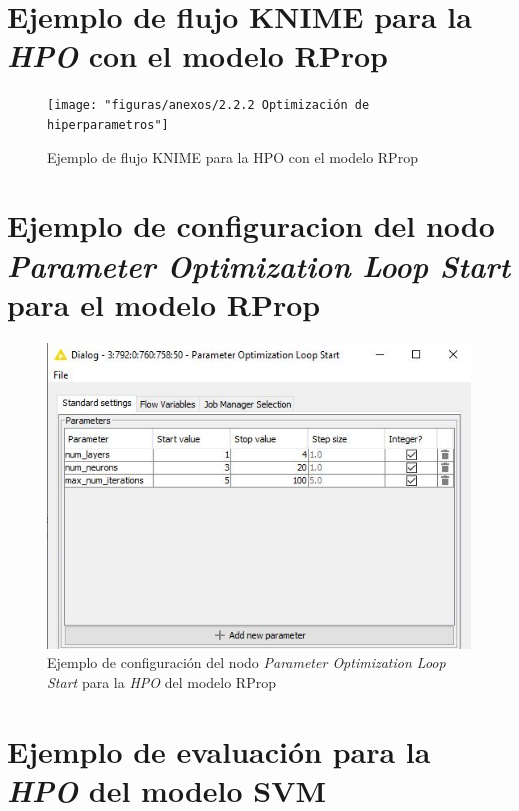 \chapter{Ejemplo de flujo KNIME para la \textit{HPO} con el modelo RProp} \label{aped:5}

\begin{figure}[H]
	\centering
	\texttt{[image: "figuras/anexos/2.2.2 Optimización de hiperparametros"]}
	\caption{Ejemplo de flujo KNIME para la HPO con el modelo RProp}
	\label{anex:hpo-rprop}
\end{figure}

\chapter{Ejemplo de configuracion del nodo \textit{Parameter Optimization Loop Start} para el modelo RProp } \label{aped:6}

\begin{figure}[H]
	\centering
	\includegraphics[width=\textwidth]{"figuras/anexos/Anexo random Configuración del nodo Loop Start para optimización de hiperparámetros"}
	\caption{Ejemplo de configuración del nodo \textit{Parameter Optimization Loop Start} para la \textit{HPO} del modelo RProp}
	\label{anex:configuracion-loop-start-para-optimizacion-de-hiperparametros}
\end{figure}

\chapter{Ejemplo de evaluación para la \textit{HPO} del modelo SVM} \label{aped:7}

